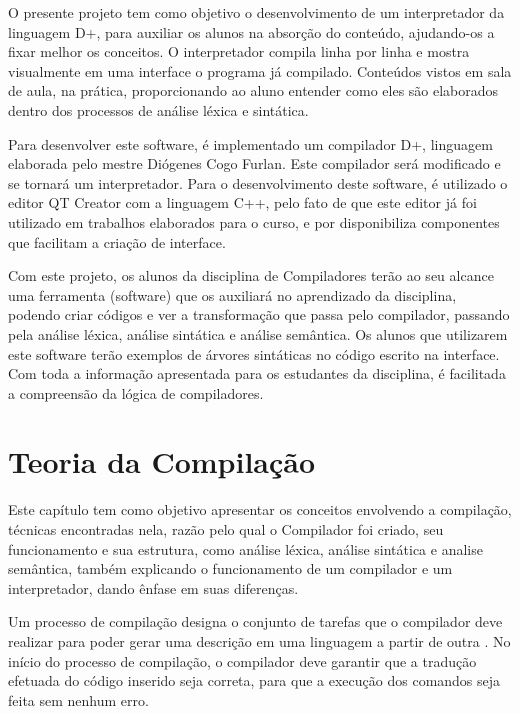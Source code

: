\documentclass[12pt,oneside,a4paper,chapter=TITLE,section=TITLE,sumario=tradicional]{abntex2}
\begin{document}
O presente projeto tem como objetivo o desenvolvimento de um interpretador da linguagem D+, para auxiliar os alunos na absorção do conteúdo, ajudando-os a fixar melhor os conceitos. O interpretador compila linha por linha e mostra visualmente em uma interface o programa já compilado. Conteúdos vistos em sala de aula, na prática, proporcionando ao aluno entender como eles são elaborados dentro dos processos de análise léxica e sintática.

Para desenvolver este software, é implementado um compilador D+, linguagem elaborada pelo mestre Diógenes Cogo Furlan. Este compilador será modificado e se tornará um interpretador. Para o desenvolvimento deste software, é utilizado o editor QT Creator com a linguagem C++, pelo fato de que este editor já foi utilizado em trabalhos elaborados para o curso, e por disponibiliza componentes que facilitam a criação de interface.

Com este projeto, os alunos da disciplina de Compiladores terão ao seu alcance uma ferramenta (software) que os auxiliará no aprendizado da disciplina, podendo criar códigos e ver a transformação que passa pelo compilador, passando pela análise léxica, análise sintática e análise semântica. Os alunos que utilizarem este software terão exemplos de árvores sintáticas no código escrito na interface. Com toda a informação apresentada para os estudantes da disciplina, é facilitada a compreensão da lógica de compiladores.

\chapter{Teoria da Compilação}
\label{cap:teoria-da-compilação}

Este capítulo tem como objetivo apresentar os conceitos envolvendo a compilação, técnicas encontradas nela, razão pelo qual o Compilador foi criado, seu funcionamento e sua estrutura, como análise léxica, análise sintática e analise semântica, também explicando o funcionamento de um compilador e um interpretador, dando ênfase em suas diferenças.

Um processo de compilação designa o conjunto de tarefas que o compilador deve realizar para poder gerar uma descrição em uma linguagem a partir de outra \cite{pedro2018}. No início do processo de compilação, o compilador deve garantir que a tradução efetuada do código inserido seja correta, para que a execução dos comandos seja feita sem nenhum erro.
\end{document}
